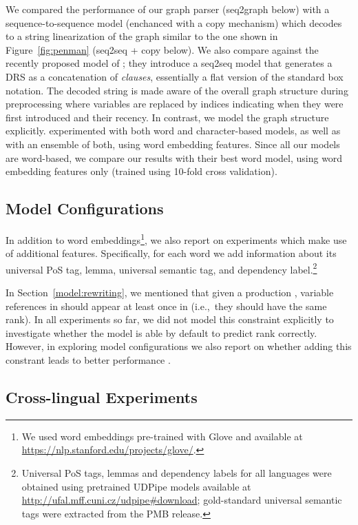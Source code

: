 \documentclass[11pt,a4paper]{article}
\theoremstyle{plain}
\begin{document}
We compared the performance of our graph parser ({seq2graph} below)
with a sequence-to-sequence model (enchanced with a copy mechanism)
which decodes to a string linearization of the graph similar to the one shown in Figure~\ref{fig:penman} ({seq2seq + copy} below). We also
compare against the recently proposed model of
\citet{van2018exploring}; they introduce a seq2seq model that
generates a DRS as a concatenation of \textit{clauses}, essentially a
flat version of the standard box notation. The decoded string is made
aware of the overall graph structure during preprocessing where
variables are replaced by indices indicating when they were first
introduced and their recency. In contrast, we model the graph
structure explicitly. \citet{van2018exploring} experimented with both
word and character-based models, as well as with an ensemble of both,
using word embedding features. Since all our models are word-based, we
compare our results with their best word model, using word embedding
features only (trained using 10-fold cross validation).

\subsection{Model Configurations}

In addition to word embeddings\footnote{We used word embeddings pre-trained with Glove and available at \url{https://nlp.stanford.edu/projects/glove/}.}, we also report on
experiments which make use of additional features. Specifically, for
each word we add information about its universal PoS tag, lemma,
universal semantic tag, and dependency label.\footnote{Universal PoS
  tags, lemmas and dependency labels for all languages were obtained
  using pretrained UDPipe models available at
  \url{http://ufal.mff.cuni.cz/udpipe\#download}; gold-standard
  universal semantic tags were extracted from the PMB release.}

In Section~\ref{model:rewriting}, we mentioned that given a production , variable references in  should appear at least once in  (i.e.,~they should have the same rank). In all experiments so far, we did not model this constraint explicitly to investigate whether the model is able by default to predict rank correctly. However, in exploring model configurations we also report on whether adding this constrant leads to better performance . 

\subsection{Cross-lingual Experiments}
\end{document}

